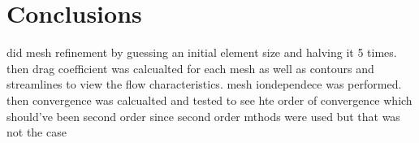 \section{Conclusions}
did mesh refinement by guessing an initial element size and halving it 5 times. then drag coefficient was calcualted for each mesh as well as contours and streamlines to view the flow characteristics. mesh iondependece was performed. then convergence was calcualted and tested to see hte order of convergence which should've been second order since second order mthods were used but that was not the case 